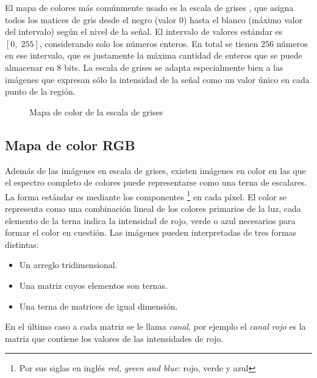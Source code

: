 El mapa de colores más comúnmente usado es la escala de grises \cite{enwiki:gs}, que asigna todos los matices de gris desde el negro (valor $0$) hasta el blanco (máximo valor del intervalo) según el nivel de la señal. El intervalo de valores estándar es $[0,\; 255]$, considerando solo los n\'umeros enteros. En total se tienen $256$ n\'umeros en ese intervalo, que es justamente la m\'axima cantidad de enteros que se puede almacenar en 8 bits. La escala de grises se adapta especialmente bien a las imágenes que expresan sólo la intensidad de la señal como un valor único en cada punto de la región.
\begin{figure}[h]
	\centering
	\caption{Mapa de color de la escala de grises}
\end{figure}

\subsection{Mapa de color RGB}

Además de las imágenes en escala de grises, existen imágenes en color en las que el espectro completo de colores puede representarse como una terna de escalares. La forma est\'andar es mediante los componentes \RGB\footnote{Por sus siglas en ingl\'es \textit{red, green and blue}: rojo, verde y azul}\cite{enwiki:rgb} en cada píxel. El color se representa como una combinación lineal de los colores primarios de la luz, cada elemento de la terna indica la intensidad de rojo, verde o azul necesarios para formar el color en cuesti\'on. Las im\'agenes \RGB pueden interpretadas de tres formas distintas:
\begin{itemize}
	\item Un arreglo tridimensional.
	\item Una matriz cuyos elementos son ternas.
	\item Una terna de matrices de igual dimensi\'on.
\end{itemize}
En el \'ultimo caso a cada matriz se le llama \textit{canal}, por ejemplo el \textit{canal rojo} es la matriz que contiene los valores de las intensidades de rojo.

